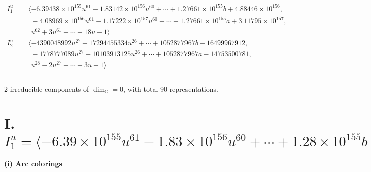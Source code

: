 \documentclass[1p]{elsarticle_modified}
\theoremstyle{definition}
\begin{document}
\begin{align*}
I^u_{1}&=\langle 
-6.39438\times10^{155} u^{61}-1.83142\times10^{156} u^{60}+\cdots+1.27661\times10^{155} b+4.88446\times10^{156},\\
\phantom{I^u_{1}}&\phantom{= \langle  }-4.08969\times10^{156} u^{61}-1.17222\times10^{157} u^{60}+\cdots+1.27661\times10^{155} a+3.11795\times10^{157},\\
\phantom{I^u_{1}}&\phantom{= \langle  }u^{62}+3 u^{61}+\cdots-18 u-1\rangle \\
I^u_{2}&=\langle 
-4390048992 u^{27}+17294455334 u^{26}+\cdots+1052877967 b-16499967912,\\
\phantom{I^u_{2}}&\phantom{= \langle  }-1778777089 u^{27}+10103913125 u^{26}+\cdots+1052877967 a-14753500781,\\
\phantom{I^u_{2}}&\phantom{= \langle  }u^{28}-2 u^{27}+\cdots-3 u-1\rangle \\
\\
\end{align*}
\raggedright * 2 irreducible components of $\dim_{\mathbb{C}}=0$, with total 90 representations.\\
\newpage
\renewcommand{\arraystretch}{1}
\centering \section*{I. $I^u_{1}= \langle -6.39\times10^{155} u^{61}-1.83\times10^{156} u^{60}+\cdots+1.28\times10^{155} b+4.88\times10^{156},\;-4.09\times10^{156} u^{61}-1.17\times10^{157} u^{60}+\cdots+1.28\times10^{155} a+3.12\times10^{157},\;u^{62}+3 u^{61}+\cdots-18 u-1 \rangle$}
\flushleft \textbf{(i) Arc colorings}\\
\end{document}
